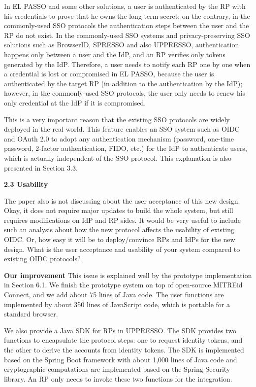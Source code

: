 \documentclass[letterpaper,onecolumn,10pt]{article}
\begin{document}
In EL PASSO and some other solutions,
    a user is authenticated by the RP with his credentials
            to prove that he owns the long-term secret;
            on the contrary,
 in the commonly-used SSO protocols    the authentication steps between the user and the RP do not exist.
In the commonly-used SSO systems and privacy-preserving SSO solutions
    such as BrowserID, SPRESSO and also UPPRESSO,
    authentication happens only between a user and the IdP,
    and an RP verifies only tokens generated by the IdP.
Therefore,
        a user needs to notify each RP one by one when a credential is lost or compromised in EL PASSO,
    because the user is authenticated by the target RP (in addition to the authentication by the IdP);
however, in the commonly-used SSO protocols, the user only needs to renew his only credential at the IdP if it is compromised.

This is a very important reason that the existing SSO protocols are widely deployed in the real world.
This feature enables an SSO system such as OIDC and OAuth 2.0 to adopt any authentication mechanism
 (password, one-time password, 2-factor authentication, FIDO, etc.) for the IdP to authenticate users,
  which is actually independent of the SSO protocol.
This explanation is also presented in Section 3.3.

\vspace{1mm}\noindent\textbf{2.3 Usability}

The paper also is not discussing about the user acceptance of this new design.
Okay, it does not require major updates to build the whole system, but still requires modifications on IdP and RP sides.
It would be very useful to include such an analysis about how the new protocol affects the usability of existing OIDC.
Or, how easy it will be to deploy/convince RPs and IdPs for the new design.
What is the user acceptance and usability of your system compared to existing OIDC protocols?

\vspace{1mm}\noindent\textbf{Our improvement}
This issue is explained well by the prototype implementation in Section 6.1.
We finish the prototype system on top of open-source MITREid Connect,
    and we add about 75 lines of Java code.
The user functions are implemented by about 350 lines of JavaScript code,
    which is portable for a standard browser.

We also provide a Java SDK for RPs in UPPRESSO.
The SDK provides two functions to encapsulate the protocol steps:
one to request identity tokens, and the other to derive the accounts from identity tokens.
 The SDK is implemented based on the Spring Boot framework with about 1,000 lines of Java code
  and cryptographic computations are implemented based on the Spring Security library.
An RP only needs to invoke these two functions for the integration.
\end{document}
